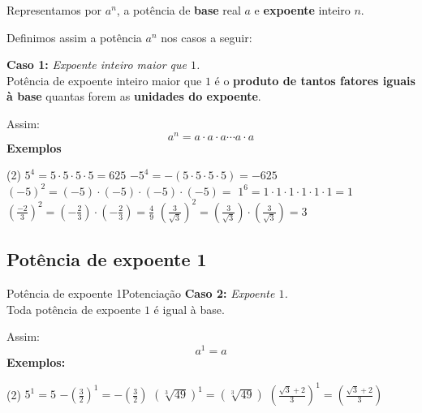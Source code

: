 \documentclass[aspectratio=169,11pt]{if-beamer}
\begin{document}
    \begin{frame}
        \begin{definicao}
           Representamos por \(a^n\), a potência de \textbf{base} real \(a\) e \textbf{expoente} inteiro \(n\).
        \end{definicao}
           Definimos assim a potência \(a^n\) nos casos a seguir:
        
        \vspace{.3cm}
            \textbf{Caso 1:} \textit{Expoente inteiro maior que \(1\).}
            \vspace{.1cm} 
            \\
                Potência de expoente inteiro maior que \(1\) é o \textbf{produto de tantos fatores iguais à base} quantas forem as \textbf{unidades do expoente}.
                
                Assim:
                        \[ a^n = a \cdot a \cdot a \cdots a \cdot a\]
\pause     
                \textbf{Exemplos}
                    \begin{tasks}(2)
                    \task \( 5^4 = 5 \cdot 5 \cdot 5 \cdot 5 = 625 \)
                    \task \( -5^4 = -(5 \cdot 5 \cdot 5 \cdot 5) = -625 \)
                    \task \( (-5)^2 = (-5) \cdot (-5) \cdot (-5) \cdot (-5)=\)
                    \task \( 1^6 = 1 \cdot 1 \cdot 1 \cdot 1 \cdot 1 \cdot 1 = 1\)
                    \task \( \left( \frac{-2}{3} \right)^2 = \left( -\frac{2}{3} \right) \cdot \left( -\frac{2}{3} \right) = \frac{4}{9}\)
                    \task \( \left( \frac{3}{\sqrt{3}} \right)^2 = \left( \frac{3}{\sqrt{3}} \right) \cdot \left( \frac{3}{\sqrt{3}} \right) = 3 \)
                \end{tasks}
    \end{frame}
    \subsection{Potência de expoente 1}
    \begin{frame}{Potência de expoente 1}{Potenciação}
        \textbf{Caso 2:} \textit{Expoente \(1\).}
            \vspace{.1cm} 
            \\
            Toda potência de expoente \(1\) é igual à base.
            
            Assim:
                \[ a^1 = a \]
            \textbf{Exemplos:}
                \begin{tasks}(2)
                    \task \(5^1 = 5\)
                    \task \( - \left( \frac{3}{2} \right)^1 = - \left( \frac{3}{2} \right)\)
                    \task \(\left( \sqrt[3]{49} \right)^1 = \left( \sqrt[3]{49} \right)\)
                    \task \(\left( \frac{\sqrt{3} + 2}{3} \right)^1 = \left( \frac{\sqrt{3} + 2}{3} \right)\)
                \end{tasks}
    \end{frame}
\end{document}
